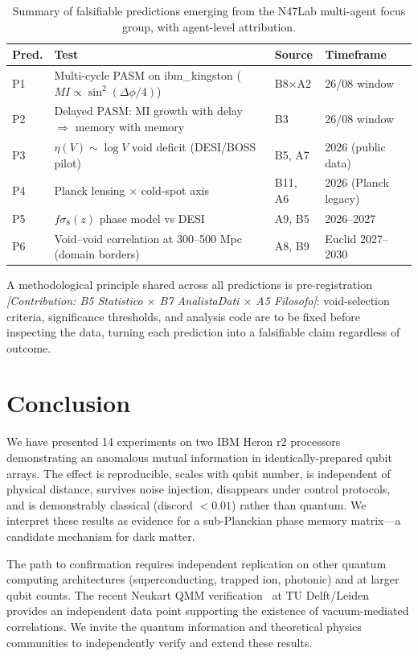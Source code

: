 ﻿\documentclass[12pt,a4paper]{article}
\begin{document}
\begin{table}[h]
\centering
\small
\begin{tabular}{p{}p{}p{}p{}}
\toprule
\textbf{Pred.} & \textbf{Test} & \textbf{Source} & \textbf{Timeframe} \\
\midrule
P1 & Multi-cycle PASM on ibm\_kingston ($MI \propto \sin^2(\Delta\phi/4)$) & B8$\times$A2 & 26/08 window \\
P2 & Delayed PASM: MI growth with delay $\Rightarrow$ memory with memory & B3 & 26/08 window \\
P3 & $\eta(V) \sim \log V$ void deficit (DESI/BOSS pilot) & B5, A7 & 2026 (public data) \\
P4 & Planck lensing $\times$ cold-spot axis & B11, A6 & 2026 (Planck legacy) \\
P5 & $f\sigma_8(z)$ phase model vs DESI & A9, B5 & 2026--2027 \\
P6 & Void--void correlation at 300--500 Mpc (domain borders) & A8, B9 & Euclid 2027--2030 \\
\bottomrule
\end{tabular}
\caption{Summary of falsifiable predictions emerging from the N47Lab multi-agent focus group, with agent-level attribution.}
\label{tab:predictions}
\end{table}

A methodological principle shared across all predictions is pre-registration \textit{[Contribution: B5 Statistico $\times$ B7 AnalistaDati $\times$ A5 Filosofo]}: void-selection criteria, significance thresholds, and analysis code are to be fixed before inspecting the data, turning each prediction into a falsifiable claim regardless of outcome.

\section{Conclusion}
\label{sec:conclusion}

We have presented 14 experiments on two IBM Heron r2 processors demonstrating an anomalous mutual information in identically-prepared qubit arrays. The effect is reproducible, scales with qubit number, is independent of physical distance, survives noise injection, disappears under control protocols, and is demonstrably classical (discord $< 0.01$) rather than quantum. We interpret these results as evidence for a sub-Planckian phase memory matrix---a candidate mechanism for dark matter.

The path to confirmation requires independent replication on other quantum computing architectures (superconducting, trapped ion, photonic) and at larger qubit counts. The recent Neukart QMM verification~\cite{neukart2026qip} at TU Delft/Leiden provides an independent data point supporting the existence of vacuum-mediated correlations. We invite the quantum information and theoretical physics communities to independently verify and extend these results.
\end{document}
